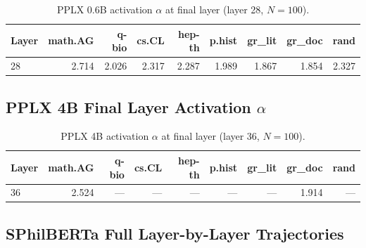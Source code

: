 \documentclass[11pt,letterpaper]{article}
\newcommand{\al}{\alpha}
\begin{document}
\begin{longtable}{lrrrrrrrr}
\caption{PPLX 0.6B activation $\al$ at final layer
(layer 28, $N = 100$).} \\
\toprule
\textbf{Layer} & \textbf{math.AG} & \textbf{q-bio} & \textbf{cs.CL} &
\textbf{hep-th} & \textbf{p.hist} & \textbf{gr\_lit} &
\textbf{gr\_doc} & \textbf{rand} \\
\midrule
28 & 2.714 & 2.026 & 2.317 & 2.287 & 1.989 & 1.867 & 1.854 & 2.327 \\
\bottomrule
\end{longtable}

\subsection{PPLX 4B Final Layer Activation $\al$}

\begin{longtable}{lrrrrrrrr}
\caption{PPLX 4B activation $\al$ at final layer
(layer 36, $N = 100$).} \\
\toprule
\textbf{Layer} & \textbf{math.AG} & \textbf{q-bio} & \textbf{cs.CL} &
\textbf{hep-th} & \textbf{p.hist} & \textbf{gr\_lit} &
\textbf{gr\_doc} & \textbf{rand} \\
\midrule
36 & 2.524 & --- & --- & --- & --- & --- & 1.914 & --- \\
\bottomrule
\end{longtable}

\subsection{SPhilBERTa Full Layer-by-Layer Trajectories}
\end{document}

